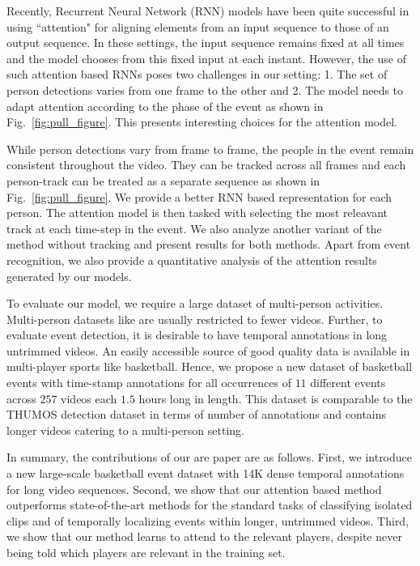 Recently, Recurrent Neural Network (RNN) models have been quite successful in
using ``attention" \cite{Bahdnau_arxiv14,Xu_arxiv15,Yao_arxiv15} for aligning
elements from an input sequence to those of an output sequence. In these settings,
the input sequence remains fixed at all times and the model chooses from this
fixed input at each instant. However, the use of such attention based RNNs
poses two challenges in our setting:
1. The set of person detections varies from one frame to the other and
2. The model needs to adapt attention according to the phase of the event as
shown in Fig.~\ref{fig:pull_figure}. This presents interesting choices
for the attention model.

While person detections vary from frame to frame, the people in the event
remain consistent throughout the video. They can be tracked across all frames
and each person-track can be treated as a separate sequence as shown in
Fig.~\ref{fig:pull_figure}.  We provide a better RNN based representation for
each person. The attention model is then tasked with selecting the most
releavant track at each time-step in the event.  We also analyze another
variant of the method without tracking and present results for both methods.
Apart from event recognition, we also provide a quantitative analysis of the
attention results generated by our models.

To evaluate our model, we require a large dataset of multi-person activities.
Multi-person datasets like \cite{Ryoo_ICCV09,VIRAT,Choi_ICCV09} are usually restricted to fewer videos.
Further, to evaluate event detection, it is desirable to have temporal annotations in long
untrimmed videos. An easily accessible source of good quality data is
available in multi-player sports like basketball.
Hence, we propose a new dataset of basketball events with time-stamp annotations for
all occurrences of $11$ different events across $257$ videos each $1.5$ hours
long in length.  This dataset is comparable to the THUMOS \cite{THUMOS}
detection dataset in terms of number of annotations and contains longer videos
catering to a multi-person setting.

In summary, the contributions of our are paper are as follows.  First, we
introduce a new  large-scale basketball event dataset with 14K dense temporal
annotations for long video sequences.  Second, we show that our attention based method
outperforms state-of-the-art methods for the standard tasks of classifying
isolated clips and of temporally localizing events within longer, untrimmed
videos.  Third, we show that our method learns to attend to the relevant
players, despite never being told which players are relevant in the training
set.
